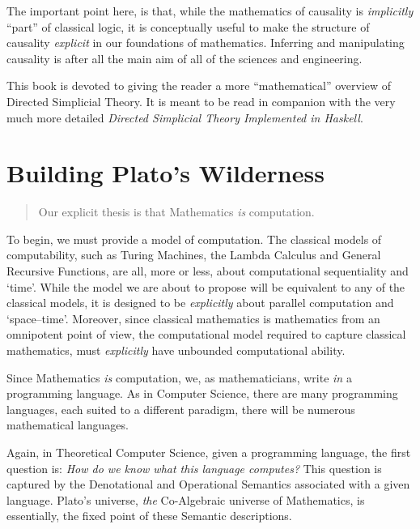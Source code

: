\documentclass[a4paper,openany]{amsbook}
\newenvironment{myQuote}{\begin{quotation}}{\end{quotation}}
\begin{document}
The important point here, is that, while the mathematics of causality is
\emph{implicitly} ``part'' of classical logic, it is conceptually useful to make
the structure of causality \emph{explicit} in our foundations of mathematics. 
Inferring and manipulating causality is after all the main aim of all of the
sciences and engineering.

This book is devoted to giving the reader a more ``mathematical'' overview of
Directed Simplicial Theory.  It is meant to be read in companion with the very
much more detailed \textit{Directed Simplicial Theory Implemented in Haskell}.

\section{Building Plato's Wilderness}

\begin{myQuote}
Our explicit thesis is that Mathematics \emph{is} computation.
\end{myQuote}

To begin, we must provide a model of computation. The classical models of
computability, such as Turing Machines, the Lambda Calculus and General
Recursive Functions, are all, more or less, about computational sequentiality
and `time'. While the model we are about to propose will be equivalent to any of
the classical models, it is designed to be \emph{explicitly} about parallel
computation and `space--time'. Moreover, since classical mathematics is
mathematics from an omnipotent point of view, the computational model required
to capture classical mathematics, must \emph{explicitly} have unbounded
computational ability.

Since Mathematics \emph{is} computation, we, as mathematicians, write \emph{in}
a programming language. As in Computer Science, there are many programming
languages, each suited to a different paradigm, there will be numerous
mathematical languages.

Again, in Theoretical Computer Science, given a programming language, the first
question is: \emph{How do we know what this language computes?} This question is
captured by the Denotational and Operational Semantics associated with a given
language. Plato's universe, \emph{the} Co-Algebraic universe of Mathematics,
is essentially, the fixed point of these Semantic descriptions.
\end{document}
